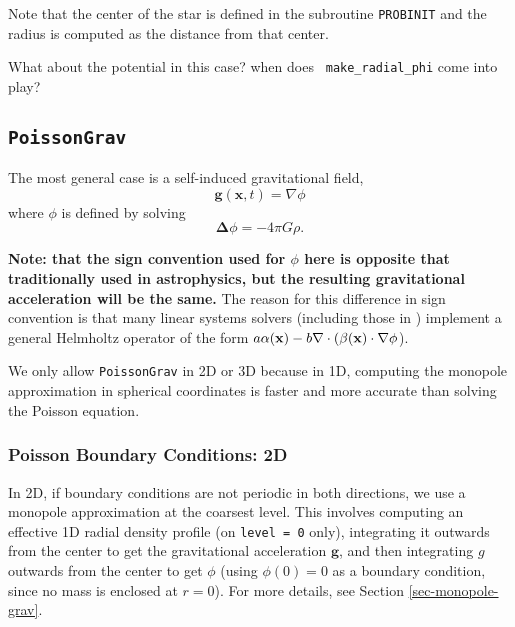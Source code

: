 \begin{itemize}
Note that the center of the star is defined in the subroutine {\tt PROBINIT}
and the radius is computed as the distance from that center.


\end{itemize}


{\color{red} What about the potential in this case? when does {\tt
    make\_radial\_phi} come into play?}


\subsection{{\tt PoissonGrav}}

The most general case is a self-induced gravitational field,
\begin{equation}
\mathbf{g}(\mathbf{x},t) = \nabla \phi
\end{equation}
where $\phi$ is defined by solving
\begin{equation}
\mathbf{\Delta} \phi = -4 \pi G \rho .\label{eq:Self Gravity}
\end{equation}

{\bf Note: that the sign convention used for $\phi$ here is opposite
  that traditionally used in astrophysics, but the resulting
  gravitational acceleration will be the same.}  The reason for this
difference in sign convention is that many linear systems solvers
(including those in \boxlib) implement a general Helmholtz operator of
the form $a \alpha({\bf x}) - b \nabla \cdot (\beta({\bf x}) \cdot
\nabla \phi$).

We only allow {\tt PoissonGrav} in 2D or 3D because in 1D, computing
the monopole approximation in spherical coordinates is faster and more
accurate than solving the Poisson equation.

\subsubsection{Poisson Boundary Conditions: 2D}

In 2D, if boundary conditions are not periodic in both directions, we
use a monopole approximation at the coarsest level. This involves
computing an effective 1D radial density profile (on {\tt level =
  0} only), integrating it outwards from the center to get the
gravitational acceleration $\mathbf{g}$, and then integrating $g$
outwards from the center to get $\phi$ (using $\phi(0) = 0$ as a
boundary condition, since no mass is enclosed at $r = 0$). For more
details, see Section \ref{sec-monopole-grav}.

